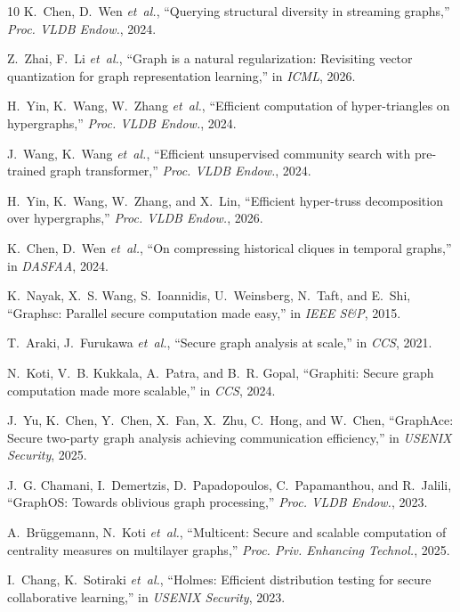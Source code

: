 \documentclass[conference,compsoc,letterpaper]{IEEEtran}
\theoremstyle{definition}
\theoremstyle{remark}
\begin{document}
\begin{thebibliography}{10}
K.~Chen, D.~Wen \emph{et~al.}, ``Querying structural diversity in streaming
  graphs,'' \emph{Proc. {VLDB} Endow.}, 2024.

Z.~Zhai, F.~Li \emph{et~al.}, ``Graph is a natural regularization: Revisiting
  vector quantization for graph representation learning,'' in \emph{ICML},
  2026.

H.~Yin, K.~Wang, W.~Zhang \emph{et~al.}, ``Efficient computation of
  hyper-triangles on hypergraphs,'' \emph{Proc. {VLDB} Endow.}, 2024.

J.~Wang, K.~Wang \emph{et~al.}, ``Efficient unsupervised community search with
  pre-trained graph transformer,'' \emph{Proc. {VLDB} Endow.}, 2024.

H.~Yin, K.~Wang, W.~Zhang, and X.~Lin, ``Efficient hyper-truss decomposition
  over hypergraphs,'' \emph{Proc. {VLDB} Endow.}, 2026.

K.~Chen, D.~Wen \emph{et~al.}, ``On compressing historical cliques in temporal
  graphs,'' in \emph{DASFAA}, 2024.

K.~Nayak, X.~S. Wang, S.~Ioannidis, U.~Weinsberg, N.~Taft, and E.~Shi,
  ``Graphsc: Parallel secure computation made easy,'' in \emph{IEEE S\&P},
  2015.

T.~Araki, J.~Furukawa \emph{et~al.}, ``Secure graph analysis at scale,'' in
  \emph{CCS}, 2021.

N.~Koti, V.~B. Kukkala, A.~Patra, and B.~R. Gopal, ``{Graphiti}: Secure graph
  computation made more scalable,'' in \emph{CCS}, 2024.

J.~Yu, K.~Chen, Y.~Chen, X.~Fan, X.~Zhu, C.~Hong, and W.~Chen, ``{GraphAce}:
  Secure two-party graph analysis achieving communication efficiency,'' in
  \emph{USENIX Security}, 2025.

J.~G. Chamani, I.~Demertzis, D.~Papadopoulos, C.~Papamanthou, and R.~Jalili,
  ``{GraphOS}: Towards oblivious graph processing,'' \emph{Proc. {VLDB}
  Endow.}, 2023.

A.~Br{\"u}ggemann, N.~Koti \emph{et~al.}, ``Multicent: Secure and scalable
  computation of centrality measures on multilayer graphs,'' \emph{Proc. Priv.
  Enhancing Technol.}, 2025.

I.~Chang, K.~Sotiraki \emph{et~al.}, ``Holmes: Efficient distribution testing
  for secure collaborative learning,'' in \emph{USENIX Security}, 2023.


\end{thebibliography}
\end{document}
